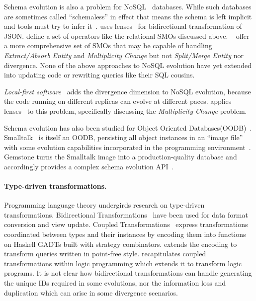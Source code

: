 \documentclass[english,submission]{programming}
\begin{document}
Schema evolution is also a problem for NoSQL~\cite{sadalage12} databases. While such databases are sometimes called ``schemaless'' in effect that means the schema is left implicit and tools must try to infer it~\cite{storl20, storl22}. \citet{Cambria} uses lenses~\cite{Foster2007} for bidirectional transformation of JSON. \citet{scherzinger13} define a set of operators like the relational SMOs discussed above. \citeauthor*{chillon21}~\cite{chillon21, chillon22} offer a more comprehensive set of SMOs that may be capable of handling \textit{Extract/Absorb Entity} and \textit{Multiplicity Change} but not \textit{Split/Merge Entity} nor divergence. None of the above approaches to NoSQL evolution have yet extended into updating code or rewriting queries like their SQL cousins.

\emph{Local-first software}~\cite{localfirst} adds the divergence dimension to NoSQL evolution, because the code running on different replicas can evolve at different paces. \citet{Cambria} applies lenses~\cite{Foster2007} to this problem, specifically discussing the \emph{Multiplicity Change} problem.

Schema evolution has also been studied for Object Oriented Databases(OODB)~\cite{li99,banerjee87}. Smalltalk~\cite{Goldberg80} is itself an OODB, persisting all object instances in an ``image file'' with some evolution capabilities incorporated in the programming environment~\cite[pp.252-272]{Goldberg80}. Gemstone turns the Smalltalk image into a production-quality database and accordingly provides a complex schema evolution API~\cite{Gemstone}.

\paragraph{Type-driven transformations.}
Programming language theory undergirds research on type-driven transformations. Bidirectional Transformations~\cite{czarnecki2009bidirectional} have been used for data format conversion and view update.
Coupled Transformations~\cite{Berdaguer07, alcino06, Cleve2006} express transformations coordinated between types and their instances by encoding them into functions on Haskell GADTs built with strategy combinators. \citet{JVisser08} extends the encoding to transform queries written in point-free style. \citet{lammel16} recapitulates coupled transformations within logic programming which extends it to transform logic programs. It is not clear how bidirectional transformations can handle generating the unique IDs required in some evolutions, nor the information loss and duplication which can arise in some divergence scenarios.
\end{document}
